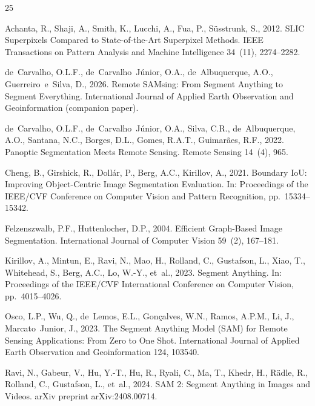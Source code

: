 \documentclass[review,11pt,authoryear]{elsarticle}
\begin{document}
\begin{thebibliography}{25}

Achanta, R., Shaji, A., Smith, K., Lucchi, A., Fua, P., S\"{u}sstrunk, S., 2012. SLIC Superpixels Compared to State-of-the-Art Superpixel Methods. IEEE Transactions on Pattern Analysis and Machine Intelligence 34~(11), 2274--2282.

de~Carvalho, O.L.F., de~Carvalho~J\'{u}nior, O.A., de~Albuquerque, A.O., Guerreiro~e~Silva, D., 2026. Remote SAMsing: From Segment Anything to Segment Everything. International Journal of Applied Earth Observation and Geoinformation (companion paper).

de~Carvalho, O.L.F., de~Carvalho~J\'{u}nior, O.A., Silva, C.R., de~Albuquerque, A.O., Santana, N.C., Borges, D.L., Gomes, R.A.T., Guimar\~{a}es, R.F., 2022. Panoptic Segmentation Meets Remote Sensing. Remote Sensing 14~(4), 965.

Cheng, B., Girshick, R., Doll\'{a}r, P., Berg, A.C., Kirillov, A., 2021. Boundary IoU: Improving Object-Centric Image Segmentation Evaluation. In: Proceedings of the IEEE/CVF Conference on Computer Vision and Pattern Recognition, pp.~15334--15342.

Felzenszwalb, P.F., Huttenlocher, D.P., 2004. Efficient Graph-Based Image Segmentation. International Journal of Computer Vision 59~(2), 167--181.

Kirillov, A., Mintun, E., Ravi, N., Mao, H., Rolland, C., Gustafson, L., Xiao, T., Whitehead, S., Berg, A.C., Lo, W.-Y., et~al., 2023. Segment Anything. In: Proceedings of the IEEE/CVF International Conference on Computer Vision, pp.~4015--4026.

Osco, L.P., Wu, Q., de~Lemos, E.L., Gon\c{c}alves, W.N., Ramos, A.P.M., Li, J., Marcato~Junior, J., 2023. The Segment Anything Model (SAM) for Remote Sensing Applications: From Zero to One Shot. International Journal of Applied Earth Observation and Geoinformation 124, 103540.

Ravi, N., Gabeur, V., Hu, Y.-T., Hu, R., Ryali, C., Ma, T., Khedr, H., R\"{a}dle, R., Rolland, C., Gustafson, L., et~al., 2024. SAM 2: Segment Anything in Images and Videos. arXiv preprint arXiv:2408.00714.


\end{thebibliography}
\end{document}
